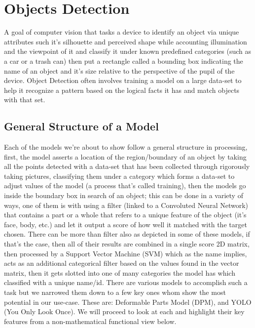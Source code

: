 
\section{Objects Detection}
A goal of computer vision that tasks a device to identify an object via unique attributes such it's silhouette and perceived shape while accounting illumination and the viewpoint of it and classify it under known predefined categories (such as a car or a trash can) then put a rectangle called a bounding box indicating the name of an object and it's size relative to the  perspective of the pupil of the device. Object Detection often involves training a model on a large data-set to help it recognize a pattern based on the logical facts it has and match objects with that set.

\subsection{General Structure of a Model}
Each of the models we're about to show follow a general structure in processing, first, the model asserts a location of the region/boundary of an object by taking all the points detected with a data-set that has been collected through rigorously taking pictures, classifying them under a category which forms a data-set to adjust values of the model (a process that's called training), then the models go inside the boundary box in search of an object; this can be done in a variety of ways, one of them is with using a filter (linked to a Convoluted Neural Network) that contains a part or a whole that refers to a unique feature of the object (it's face, body, etc.) and let it output a score of how well it matched with the target chosen. There can be more than filter also as depicted in some of these models, if that's the case, then all of their results are combined in a single score 2D matrix, then processed by a Support Vector Machine (SVM) which as the name implies, acts as an additional categorical filter based on the values found in the vector matrix, then it gets slotted into one of many categories the model has which classified with a unique name/id. There are various models to accomplish such a task but we narrowed them down to a few key ones whom show the most potential in our use-case.
These are: Deformable Parts Model (DPM), and YOLO (You Only Look Once).
We will proceed to look at each and highlight their key features from a non-mathematical functional view below.

